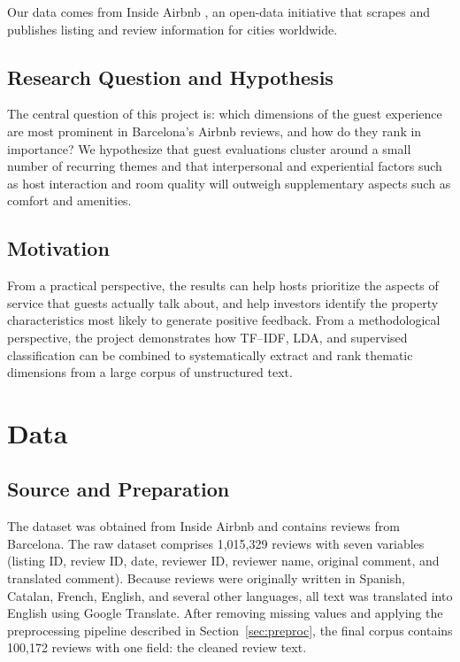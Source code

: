 \documentclass[11pt]{article}
\begin{document}
Our data comes from Inside Airbnb \citep{cox2016airbnb}, an open-data initiative that scrapes and publishes listing and review information for cities worldwide.

\subsection{Research Question and Hypothesis}
The central question of this project is: which dimensions of the guest experience are most prominent in Barcelona's Airbnb reviews, and how do they rank in importance? We hypothesize that guest evaluations cluster around a small number of recurring themes and that interpersonal and experiential factors such as host interaction and room quality will outweigh supplementary aspects such as comfort and amenities.

\subsection{Motivation}
From a practical perspective, the results can help hosts prioritize the aspects of service that guests actually talk about, and help investors identify the property characteristics most likely to generate positive feedback. From a methodological perspective, the project demonstrates how TF--IDF, LDA, and supervised classification can be combined to systematically extract and rank thematic dimensions from a large corpus of unstructured text.

\section{Data}

\subsection{Source and Preparation}
The dataset was obtained from Inside Airbnb \citep{cox2016airbnb} and contains reviews from Barcelona. The raw dataset comprises 1,015,329 reviews with seven variables (listing ID, review ID, date, reviewer ID, reviewer name, original comment, and translated comment). Because reviews were originally written in Spanish, Catalan, French, English, and several other languages, all text was translated into English using Google Translate. After removing missing values and applying the preprocessing pipeline described in Section~\ref{sec:preproc}, the final corpus contains 100,172 reviews with one field: the cleaned review text.
\end{document}
